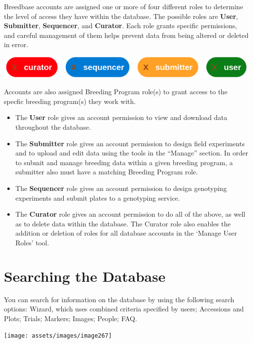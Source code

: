 \documentclass[
  12pt,
]{book}
\providecommand{\tightlist}{%
  \setlength{\itemsep}{0pt}\setlength{\parskip}{0pt}}
\begin{document}
Breedbase accounts are assigned one or more of four different roles to determine the level of access they have within the database. The possible roles are \textbf{User}, \textbf{Submitter}, \textbf{Sequencer}, and \textbf{Curator}. Each role grants specific permissions, and careful management of them helps prevent data from being altered or deleted in error.

\begin{center}\includegraphics[width=0.5\linewidth]{assets/images/roles} \end{center}

Accounts are also assigned Breeding Program role(s) to grant access to the specfic breeding program(s) they work with.

\begin{itemize}
\tightlist
\item
  The \textbf{User} role gives an account permission to view and download data throughout the database.
\item
  The \textbf{Submitter} role gives an account permission to design field experiments and to upload and edit data using the tools in the ``Manage'' section. In order to submit and manage breeding data within a given breeding program, a submitter also must have a matching Breeding Program role.
\item
  The \textbf{Sequencer} role gives an account permission to design genotyping experiments and submit plates to a genotyping service.
\item
  The \textbf{Curator} role gives an account permission to do all of the above, as well as to delete data within the database. The Curator role also enables the addition or deletion of roles for all database accounts in the `Manage User Roles' tool.
\end{itemize}

\hypertarget{searching-the-database}{%
\chapter{Searching the Database}\label{searching-the-database}}

You can search for information on the database by using the following search options: Wizard, which uses combined criteria specified by users; Accessions and Plots; Trials; Markers; Images; People; FAQ.

\begin{center}\texttt{[image: assets/images/image267]} \end{center}
\end{document}
